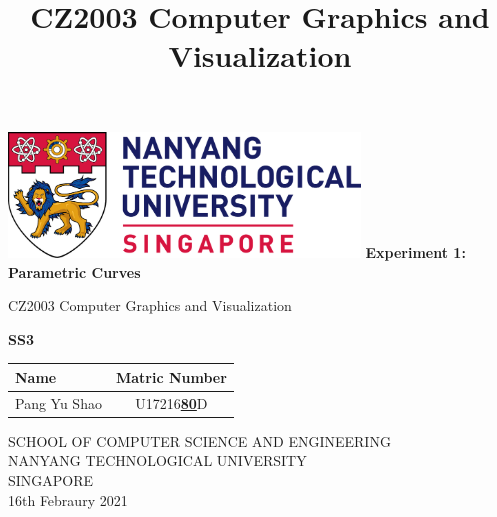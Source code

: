\documentclass[acmlarge,nonacm=true]{acmart}
\begin{document}
	
	\begin{titlepage}
		\begin{center}
			\vspace*{1cm}
			\includegraphics[width=0.7\textwidth]{fig/ntu_logo}
			\vspace{0.8cm}
			\linebreak
			\Huge
			\textbf{Experiment 1: Parametric Curves}
			
			\vspace{0.5cm}
			\LARGE
			CZ2003 Computer Graphics and Visualization
			
			\vspace{1.5cm}
			\textbf{SS3}\\
			
			\begin{table}[h]
				\begin{tabular}{lc}
					Name & Matric Number \\\hline
					Pang Yu Shao & U17216\underline{\textbf{80}}D \\
				\end{tabular}
			\end{table}
			
			
			
			\vfill
			
			\vspace{0.8cm}
			
			
			
			\Large
			SCHOOL OF COMPUTER SCIENCE AND ENGINEERING\\
			NANYANG TECHNOLOGICAL UNIVERSITY\\
			SINGAPORE\\
			16th Febraury 2021
			
		\end{center}
	\end{titlepage}

 

\title{CZ2003 Computer Graphics and Visualization}

\end{document}

